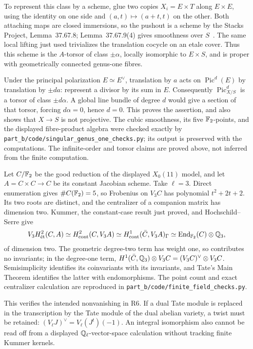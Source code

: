 \begin{example}
To represent this class by a scheme, glue two copies
\(X_i=E\times T\) along \(E\times E\), using the identity
on one side and \((a,t)\mapsto(a+t,t)\) on the other.
Both attaching maps are closed immersions, so the pushout is a
scheme by the Stacks Project, Lemma~37.67.8; Lemma~37.67.9(4)
gives smoothness over \(S\)~\cite{BStacksClosedPushout,BStacksPushoutMorphisms}.  The same local lifting just used
trivializes the translation cocycle on an etale cover.  Thus this
scheme is the \(A\)-torsor of class \(\pm\alpha\), locally
isomorphic to \(E\times S\), and is proper with geometrically
connected genus-one fibres.

Under the principal polarization \(E\simeq E^\vee\), translation
by \(a\) acts on \(\operatorname{Pic}^d(E)\) by translation
by \(\pm da\): represent a divisor by its sum in \(E\).
Consequently \(\operatorname{Pic}^d_{X/S}\) is a torsor of
class \(\pm d\alpha\).  A global line bundle of degree \(d\)
would give a section of that torsor, forcing \(d\alpha=0\),
hence \(d=0\).  This proves the assertion, and also shows that
\(X\to S\) is not projective.  The cubic smoothness, its five
\(\mathbb F_2\)-points, and the displayed fibre-product algebra were
checked exactly by
\texttt{part\_b/code/singular\_genus\_one\_checks.py}; its output
is preserved with the computations.  The infinite-order and torsor
claims are proved above, not inferred from the finite computation.
\end{example}

\begin{example}\label{ex:B-H2-constant}
Let \(C/\mathbb F_2\) be the good reduction of the displayed
\(X_0(11)\) model, and let \(A=C\times C\to C\) be its
constant Jacobian scheme.  Take \(\ell=3\).  Direct enumeration
gives \(\#C(\mathbb F_2)=5\), so Frobenius on \(V_3C\) has
polynomial \(t^2+2t+2\).  Its two roots are distinct, and the
centralizer of a companion matrix has dimension two.  Kummer,
the constant-case result just proved, and Hochschild--Serre give
\[
 V_3H^2_{\mathrm{\acute et}}(C,A)
 \simeq H^2_{\mathrm{cont}}(C,V_3A)
 \simeq H^1_{\mathrm{cont}}(\bar C,V_3A)_\Gamma
 \simeq\operatorname{End}_{\mathbb F_2}(C)\otimes\mathbb Q_3,
\]
of dimension two.  The geometric degree-two term has weight one,
so contributes no invariants; in the degree-one term,
\(H^1(\bar C,\mathbb Q_3)\otimes V_3C=(V_3C)^\vee\otimes V_3C\).
Semisimplicity identifies its coinvariants with its invariants,
and Tate's Main Theorem identifies the latter with endomorphisms.
The point count and exact centralizer calculation are reproduced in
\texttt{part\_b/code/finite\_field\_checks.py}.

This verifies the intended nonvanishing in R6.  If a dual Tate module
is replaced in the transcription by the Tate module of the dual
abelian variety, a twist must be retained:
\((V_\ell J)^\vee=V_\ell(J^t)(-1)\).
An integral isomorphism also cannot be read off from a displayed
\(\mathbb Q_\ell\)-vector-space calculation without tracking finite
Kummer kernels.
\end{example}

